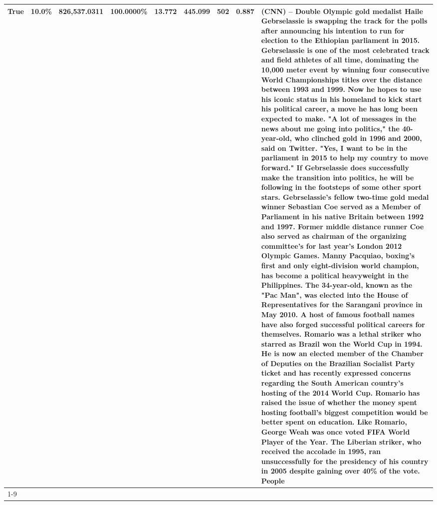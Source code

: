 \begin{table}[H]
{\begin{tabular}{lllrlllll}
True & 10.0\% & 826,537.0311 & \bfseries \color{red} 100.0000\% & 13.772 & 445.099 & 502 & 0.887 & (CNN) -- Double Olympic gold medalist Haile Gebrselassie is swapping the track for the polls after announcing his intention to run for election to the Ethiopian parliament in 2015. Gebrselassie is one of the most celebrated track and field athletes of all time, dominating the 10,000 meter event by winning four consecutive World Championships titles over the distance between 1993 and 1999. Now he hopes to use his iconic status in his homeland to kick start his political career, a move he has long been expected to make. "A lot of messages in the news about me going into politics," the 40-year-old, who clinched gold in 1996 and 2000, said on Twitter. "Yes, I want to be in the parliament in 2015 to help my country to move forward." If Gebrselassie does successfully make the transition into politics, he will be following in the footsteps of some other sport stars. Gebrselassie's fellow two-time gold medal winner Sebastian Coe served as a Member of Parliament in his native Britain between 1992 and 1997. Former middle distance runner Coe also served as chairman of the organizing committee's for last year's London 2012 Olympic Games. Manny Pacquiao, boxing's first and only eight-division world champion, has become a political heavyweight in the Philippines. The 34-year-old, known as the "Pac Man", was elected into the House of Representatives for the Sarangani province in May 2010. A host of famous football names have also forged successful political careers for themselves. Romario was a lethal striker who starred as Brazil won the World Cup in 1994. He is now an elected member of the Chamber of Deputies on the Brazilian Socialist Party ticket and has recently expressed concerns regarding the South American country's hosting of the 2014 World Cup. Romario has raised the issue of whether the money spent hosting football's biggest competition would be better spent on education. Like Romario, George Weah was once voted FIFA World Player of the Year. The Liberian striker, who received the accolade in 1995, ran unsuccessfully for the presidency of his country in 2005 despite gaining over 40\% of the vote. People \\
\cline{1-9}

\end{tabular}}
\end{table}

